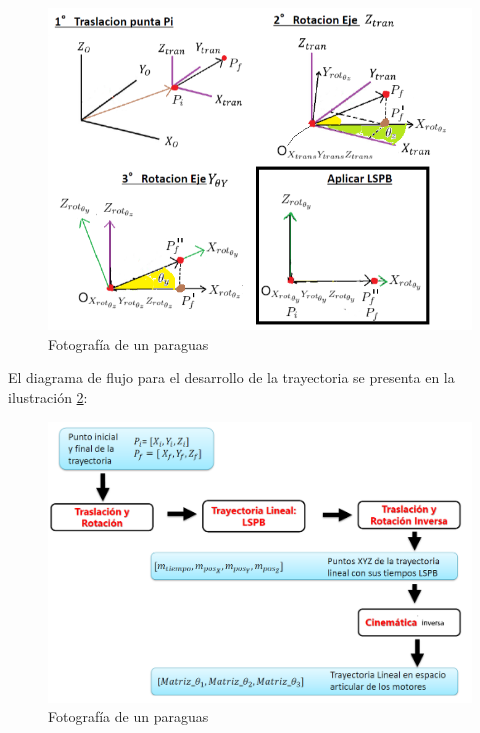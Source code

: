      \begin{figure}[htb]
            \centering
            \includegraphics[width=1\linewidth]{Main/Chapter6/Images6/cap6_trayectory_3.png}
            \caption{Fotografía de un paraguas}
            \label{f:cap6_trayectory_3}
        \end{figure} 
        
    \newpage
        
    El diagrama de flujo para el desarrollo de la trayectoria se presenta en la ilustración \ref{f:cap6_trayectory_4}:
    
     \begin{figure}[htb]
            \centering
            \includegraphics[width=1\linewidth]{Main/Chapter6/Images6/cap6_trayectory_4.png}
            \caption{Fotografía de un paraguas}
            \label{f:cap6_trayectory_4}
        \end{figure}
        
